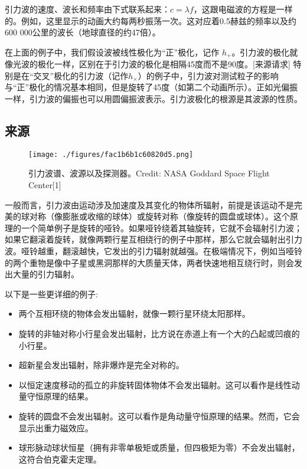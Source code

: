 引力波的速度、波长和频率由下式联系起来：$c = \lambda f$，这跟电磁波的方程是一样的。例如，这里显示的动画大约每两秒振荡一次。这对应着0.5赫兹的频率以及约600 000公里的波长（地球直径的约47倍）。

在上面的例子中，我们假设波被线性极化为“正”极化，记作 $h_+$。引力波的极化就像光波的极化一样，区别在于引力波的极化是相隔45度而不是90度。[来源请求] 特别是在“交叉”极化的引力波（记作$h_\times$）的例子中，引力波对测试粒子的影响与“正”极化的情况基本相同，但是旋转了45度（如第二个动画所示）。正如光偏振一样，引力波的偏振也可以用圆偏振波表示。引力波极化的根源是其波源的性质。

\subsection{来源}

\begin{figure}[ht]
\centering
\texttt{[image: ./figures/fac1b6b1c60820d5.png]}
\caption{引力波谱、波源以及探测器。Credit: NASA Goddard Space Flight Center[1]} \label{fig_YLB_5}
\end{figure}

一般而言，引力波由运动涉及加速度及其变化的物体所辐射，前提是该运动不是完美的球对称（像膨胀或收缩的球体）或旋转对称（像旋转的圆盘或球体）。这个原理的一个简单例子是旋转的哑铃。如果哑铃绕着其轴旋转，它就不会辐射引力波；如果它翻滚着旋转，就像两颗行星互相绕行的例子中那样，那么它就会辐射出引力波。哑铃越重，翻滚越快，它发出的引力辐射就越强。在极端情况下，例如当哑铃的两个重物是像中子星或黑洞那样的大质量天体，两者快速地相互绕行时，则会发出大量的引力辐射。

以下是一些更详细的例子:

\begin{itemize}
\item 两个互相环绕的物体会发出辐射，就像一颗行星环绕太阳那样。
\item 旋转的非轴对称小行星会发出辐射，比方说在赤道上有一个大的凸起或凹痕的小行星。
\item 超新星会发出辐射，除非爆炸是完全对称的。
\item 以恒定速度移动的孤立的非旋转固体物体不会发出辐射。这可以看作是线性动量守恒原理的结果。
\item 旋转的圆盘不会发出辐射。这可以看作是角动量守恒原理的结果。然而，它会显示出重力磁效应。
\item 球形脉动球状恒星（拥有非零单极矩或质量，但四极矩为零）不会发出辐射，这符合伯克霍夫定理。
\end{itemize}

